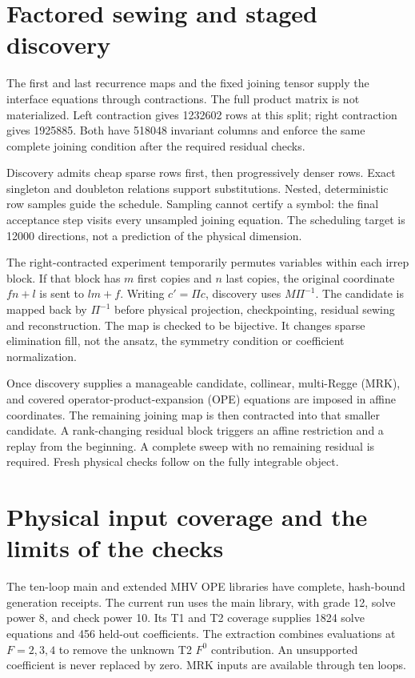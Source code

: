 \documentclass[11pt]{article}
\begin{document}
\section{Factored sewing and staged discovery}
The first and last recurrence maps and the fixed joining tensor supply the
interface equations through contractions. The full product matrix is not
materialized. Left contraction gives 1232602 rows at this split; right
contraction gives 1925885. Both have 518048 invariant columns and enforce
the same complete joining condition after the required residual checks.

Discovery admits cheap sparse rows first, then progressively denser rows.
Exact singleton and doubleton relations support substitutions. Nested,
deterministic row samples guide the schedule. Sampling cannot certify a
symbol: the final acceptance step visits every unsampled joining equation.
The scheduling target is 12000 directions, not a prediction of the physical
dimension.

The right-contracted experiment temporarily permutes variables within each
irrep block. If that block has $m$ first copies and $n$ last copies, the
original coordinate $fn+l$ is sent to $lm+f$. Writing $c'=\Pi c$, discovery
uses $M\Pi^{-1}$. The candidate is mapped back by $\Pi^{-1}$ before physical
projection, checkpointing, residual sewing and reconstruction. The map is
checked to be bijective. It changes sparse elimination fill, not the ansatz,
the symmetry condition or coefficient normalization.

Once discovery supplies a manageable candidate, collinear, multi-Regge
(MRK), and covered operator-product-expansion (OPE) equations are imposed
in affine coordinates. The remaining joining map is then contracted into
that smaller candidate. A rank-changing residual block triggers an affine
restriction and a replay from the beginning. A complete sweep with no
remaining residual is required. Fresh physical checks follow on the fully
integrable object.

\section{Physical input coverage and the limits of the checks}
The ten-loop main and extended MHV OPE libraries have complete, hash-bound
generation receipts. The current run uses the main library, with grade 12,
solve power 8, and check power 10. Its T1 and T2 coverage supplies 1824 solve
equations and 456 held-out coefficients. The extraction combines evaluations
at $F=2,3,4$ to remove the unknown T2 $F^0$ contribution. An unsupported
coefficient is never replaced by zero. MRK inputs are available through ten
loops.
\end{document}
